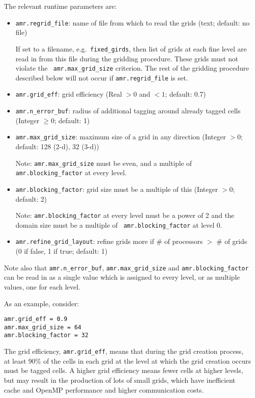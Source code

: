 The relevant runtime parameters are:
\begin{itemize}
\item {\tt amr.regrid\_file}: name of file from which to read the grids (text; default: no file)

  If set to a filename, e.g.\ {\tt fixed\_girds}, then list of grids
  at each fine level are read in from this file during the gridding
  procedure. These grids must not violate the {\tt
  amr.max\_grid\_size} criterion.  The rest of the gridding procedure
  described below will not occur if {\tt amr.regrid\_file} is set.

\item {\tt amr.grid\_eff}: grid efficiency (Real $>0$ and $<1$; default: 0.7)

\item {\tt amr.n\_error\_buf}: radius of additional tagging around already tagged cells
   (Integer $\geq 0$; default: 1)

\item {\tt amr.max\_grid\_size}: maximum size of a grid in any direction (Integer $> 0$;
   default: 128 (2-d), 32 (3-d))

   Note: {\tt amr.max\_grid\_size} must be even, and a multiple of
   {\tt amr.blocking\_factor} at every level.
   
\item {\tt amr.blocking\_factor}:  grid size must be a multiple of this (Integer $> 0$; default: 2)

   Note: {\tt amr.blocking\_factor} at every level must be a power of
   2 and the domain size must be a multiple of {\tt
   amr.blocking\_factor} at level 0.
   
\item {\tt amr.refine\_grid\_layout}: refine grids more if \# of processors $>$ \# of grids
  (0 if false, 1 if true; default: 1) \\
\end{itemize}

Note also that {\tt amr.n\_error\_buf}, {\tt amr.max\_grid\_size} and
{\tt amr.blocking\_factor} can be read in as a single value which is
assigned to every level, or as multiple values, one for each level.

As an example, consider:
\begin{lstlisting}
amr.grid_eff = 0.9
amr.max_grid_size = 64 
amr.blocking_factor = 32
\end{lstlisting}

The grid efficiency, {\tt amr.grid\_eff}, means that during the grid
creation process, at least 90\% of the cells in each grid at the level
at which the grid creation occurs must be tagged cells.  A higher
grid efficiency means fewer cells at higher levels, but may result
in the production of lots of small grids, which have inefficient cache
and OpenMP performance and higher communication costs.


